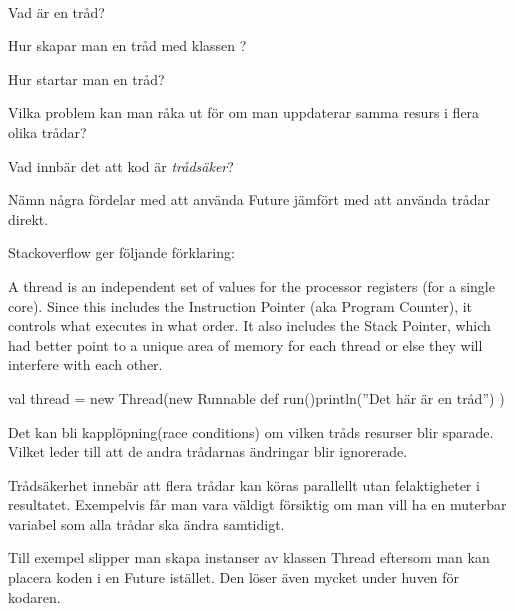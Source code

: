 \QUESTEND







\QUESTBEGIN

\Task  \what~\Pen

\Subtask Vad är en tråd?

\Subtask Hur skapar man en tråd med klassen ?

\Subtask Hur startar man en tråd?

\Subtask Vilka problem kan man råka ut för om man uppdaterar samma resurs i flera olika trådar?

\Subtask Vad innbär det att kod är \emph{trådsäker}?

\Subtask Nämn några fördelar med att använda Future jämfört med att använda trådar direkt.


\SOLUTION


\TaskSolved \what

\SubtaskSolved  Stackoverflow ger följande förklaring:

A thread is an independent set of values for the processor registers (for a single core). Since this includes the Instruction Pointer (aka Program Counter), it controls what executes in what order. It also includes the Stack Pointer, which had better point to a unique area of memory for each thread or else they will interfere with each other.

\SubtaskSolved

\begin{Code}
val thread = new Thread(new Runnable{
	def run(){println(''Det här är en tråd'')}
})
\end{Code}

\SubtaskSolved  {}

\SubtaskSolved  Det kan bli kapplöpning(race conditions) om vilken tråds resurser blir sparade. Vilket leder till att de andra trådarnas ändringar blir ignorerade.

\SubtaskSolved  Trådsäkerhet innebär att flera trådar kan köras parallellt utan felaktigheter i resultatet. Exempelvis får man vara väldigt försiktig om man vill ha en muterbar variabel som alla trådar ska ändra samtidigt.

\SubtaskSolved  Till exempel slipper man skapa instanser av klassen Thread eftersom man kan placera koden i en Future istället. Den löser även mycket under huven för kodaren.


\QUESTEND







